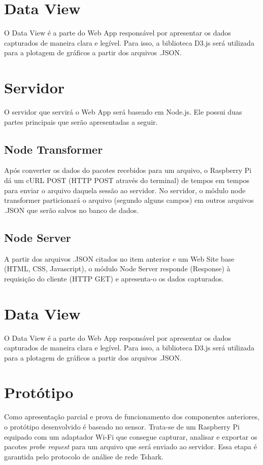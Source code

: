 \section{Data View}
O Data View é a parte do Web App responsável por apresentar os dados capturados
de maneira clara e legível. Para isso, a biblioteca D3.js \cite{D32017} será
utilizada para a plotagem de gráficos a partir dos arquivos .JSON.


\section{Servidor}
O servidor que servirá o Web App será baseado em Node.js. Ele possui duas partes principais que serão apresentadas a seguir.

\subsection{Node Transformer}
\label{node-transformer}
Após converter os dados do pacotes recebidos para um arquivo, o
Raspberry Pi dá um cURL POST (HTTP POST através do terminal) de tempos em tempos
para enviar o arquivo daquela sessão ao servidor. No servidor, o módulo
node transformer particionará o arquivo (segundo alguns campos) em outros
arquivos .JSON que serão salvos no banco de dados.

\subsection{Node Server}
 A partir dos arquivos .JSON citados no item anterior e um Web Site base (HTML,
 CSS, Javascript), o módulo Node Server responde (Response) à requisição do
 cliente (HTTP GET) e apresenta-o os dados capturados.

\section{Data View}
O Data View é a parte do Web App responsável por apresentar os dados capturados
de maneira clara e legível. Para isso, a biblioteca D3.js \cite{D32017} será
utilizada para a plotagem de gráficos a partir dos arquivos .JSON.

\section{Protótipo}
Como apresentação parcial e prova de funcionamento dos componentes anteriores, o protótipo desenvolvido é baseado no sensor.
Trata-se de um Raspberry Pi equipado com um adaptador Wi-Fi que consegue capturar, analisar e exportar os pacotes
\emph{probe request} para um arquivo que será enviado ao servidor. Essa etapa é garantida pelo protocolo de análise de rede
Tshark.

